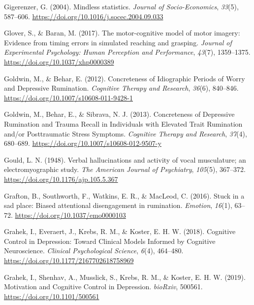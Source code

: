 \documentclass[a4paper,12pt,twoside,openright,oldfontcommands]{memoir}
\begin{document}
\leavevmode\hypertarget{ref-Gigerenzer2004}{}%
Gigerenzer, G. (2004). Mindless statistics. \emph{Journal of Socio-Economics}, \emph{33}(5), 587--606. \url{https://doi.org/10.1016/j.socec.2004.09.033}

\leavevmode\hypertarget{ref-glover_motor-cognitive_2017}{}%
Glover, S., \& Baran, M. (2017). The motor-cognitive model of motor imagery: Evidence from timing errors in simulated reaching and grasping. \emph{Journal of Experimental Psychology: Human Perception and Performance}, \emph{43}(7), 1359--1375. \url{https://doi.org/10.1037/xhp0000389}

\leavevmode\hypertarget{ref-goldwin_concreteness_2012}{}%
Goldwin, M., \& Behar, E. (2012). Concreteness of Idiographic Periods of Worry and Depressive Rumination. \emph{Cognitive Therapy and Research}, \emph{36}(6), 840--846. \url{https://doi.org/10.1007/s10608-011-9428-1}

\leavevmode\hypertarget{ref-goldwin_concreteness_2013}{}%
Goldwin, M., Behar, E., \& Sibrava, N. J. (2013). Concreteness of Depressive Rumination and Trauma Recall in Individuals with Elevated Trait Rumination and/or Posttraumatic Stress Symptoms. \emph{Cognitive Therapy and Research}, \emph{37}(4), 680--689. \url{https://doi.org/10.1007/s10608-012-9507-y}

\leavevmode\hypertarget{ref-gould_verbal_1948}{}%
Gould, L. N. (1948). Verbal hallucinations and activity of vocal musculature; an electromyographic study. \emph{The American Journal of Psychiatry}, \emph{105}(5), 367--372. \url{https://doi.org/10.1176/ajp.105.5.367}

\leavevmode\hypertarget{ref-grafton_stuck_2016}{}%
Grafton, B., Southworth, F., Watkins, E. R., \& MacLeod, C. (2016). Stuck in a sad place: Biased attentional disengagement in rumination. \emph{Emotion}, \emph{16}(1), 63--72. \url{https://doi.org/10.1037/emo0000103}

\leavevmode\hypertarget{ref-grahek_cognitive_2018}{}%
Grahek, I., Everaert, J., Krebs, R. M., \& Koster, E. H. W. (2018). Cognitive Control in Depression: Toward Clinical Models Informed by Cognitive Neuroscience. \emph{Clinical Psychological Science}, \emph{6}(4), 464--480. \url{https://doi.org/10.1177/2167702618758969}

\leavevmode\hypertarget{ref-grahek_motivation_2019}{}%
Grahek, I., Shenhav, A., Musslick, S., Krebs, R. M., \& Koster, E. H. W. (2019). Motivation and Cognitive Control in Depression. \emph{bioRxiv}, 500561. \url{https://doi.org/10.1101/500561}
\end{document}
